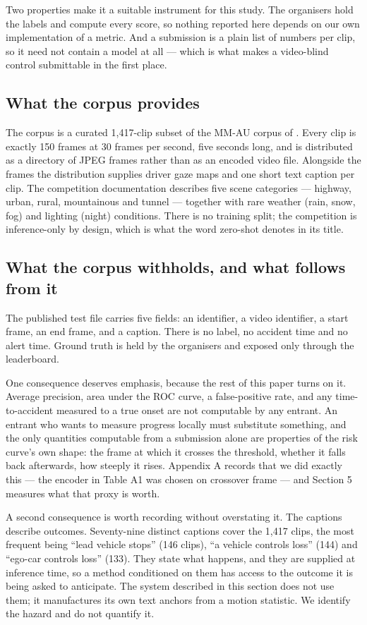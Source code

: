 Two properties make it a suitable instrument for this study. The organisers hold the labels and compute every score, so nothing reported here depends on our own implementation of a metric. And a submission is a plain list of numbers per clip, so it need not contain a model at all --- which is what makes a video-blind control submittable in the first place.

\subsection{What the corpus provides}
The corpus is a curated 1,417-clip subset of the MM-AU corpus of \citet{fang2024mmau}. Every clip is exactly 150 frames at 30 frames per second, five seconds long, and is distributed as a directory of JPEG frames rather than as an encoded video file. Alongside the frames the distribution supplies driver gaze maps and one short text caption per clip. The competition documentation describes five scene categories --- highway, urban, rural, mountainous and tunnel --- together with rare weather (rain, snow, fog) and lighting (night) conditions. There is no training split; the competition is inference-only by design, which is what the word zero-shot denotes in its title.

\subsection{What the corpus withholds, and what follows from it}
The published test file carries five fields: an identifier, a video identifier, a start frame, an end frame, and a caption. There is no label, no accident time and no alert time. Ground truth is held by the organisers and exposed only through the leaderboard.

One consequence deserves emphasis, because the rest of this paper turns on it. Average precision, area under the ROC curve, a false-positive rate, and any time-to-accident measured to a true onset are not computable by any entrant. An entrant who wants to measure progress locally must substitute something, and the only quantities computable from a submission alone are properties of the risk curve's own shape: the frame at which it crosses the threshold, whether it falls back afterwards, how steeply it rises. Appendix A records that we did exactly this --- the encoder in Table A1 was chosen on crossover frame --- and Section 5 measures what that proxy is worth.

A second consequence is worth recording without overstating it. The captions describe outcomes. Seventy-nine distinct captions cover the 1,417 clips, the most frequent being ``lead vehicle stops'' (146 clips), ``a vehicle controls loss'' (144) and ``ego-car controls loss'' (133). They state what happens, and they are supplied at inference time, so a method conditioned on them has access to the outcome it is being asked to anticipate. The system described in this section does not use them; it manufactures its own text anchors from a motion statistic. We identify the hazard and do not quantify it.


